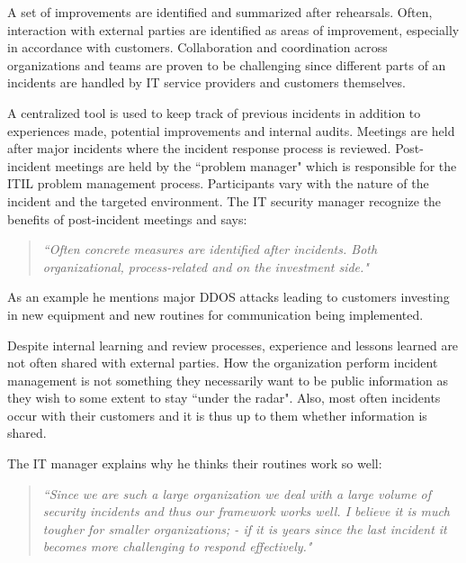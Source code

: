 A set of improvements are identified and summarized after rehearsals. Often, interaction with external parties are identified as areas of improvement, especially in accordance with customers. Collaboration and coordination across organizations and teams are proven to be challenging since different parts of an incidents are handled by IT service providers and customers themselves. 

A centralized tool is used to keep track of previous incidents in addition to experiences made, potential improvements and internal audits. Meetings are held after major incidents where the incident response process is reviewed. Post-incident meetings are held by the ``problem manager" which is responsible for the ITIL problem management process. Participants vary with the nature of the incident and the targeted environment. The IT security manager recognize the benefits of post-incident meetings and says:
\begin{quote}
\textit{``Often concrete measures are identified after incidents. Both organizational, process-related and on the investment side."}
\end{quote}
As an example he mentions major DDOS attacks leading to customers investing in new equipment and new routines for communication being implemented. 

Despite internal learning and review processes, experience and lessons learned are not often shared with external parties. How the organization perform incident management is not something they necessarily want to be public information as they wish to some extent to stay ``under the radar". Also, most often incidents occur with their customers and it is thus up to them whether information is shared. 

The IT manager explains why he thinks their routines work so well:
\begin{quote}
\textit{``Since we are such a large organization we deal with a large volume of security incidents and thus our framework works well. I believe it is much tougher for smaller organizations; - if it is years since the last incident it becomes more challenging to respond effectively."}
\end{quote}

